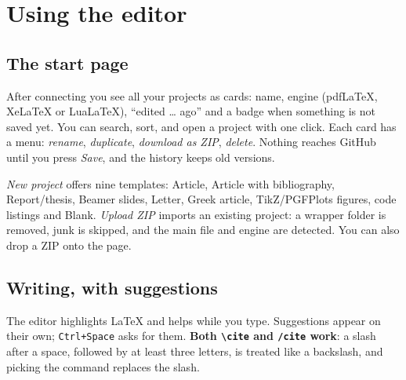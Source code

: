 \documentclass[11pt,a4paper]{article}
\newcommand{\key}[1]{\texttt{\small #1}}
\begin{document}
\section{Using the editor}

\subsection{The start page}
After connecting you see all your projects as cards: name, engine (pdf\LaTeX{}, Xe\LaTeX{} or Lua\LaTeX{}), ``edited \ldots{} ago'' and a badge when
something is not saved yet. You can search, sort, and open a project with one click. Each card has a menu: \emph{rename}, \emph{duplicate},
\emph{download as ZIP}, \emph{delete}. Nothing reaches GitHub until you press \emph{Save}, and the history keeps old versions.

\emph{New project} offers nine templates: Article, Article with bibliography, Report/thesis, Beamer slides, Letter, Greek article, TikZ/PGFPlots
figures, code listings and Blank. \emph{Upload ZIP} imports an existing project: a wrapper folder is removed, junk is skipped, and the main file
and engine are detected. You can also drop a ZIP onto the page.

\subsection{Writing, with suggestions}
The editor highlights \LaTeX{} and helps while you type. Suggestions appear on their own; \key{Ctrl+Space} asks for them.
\textbf{Both \texttt{\textbackslash cite} and \texttt{/cite} work}: a slash after a space, followed by at least three letters, is treated like a
backslash, and picking the command replaces the slash.
\end{document}
